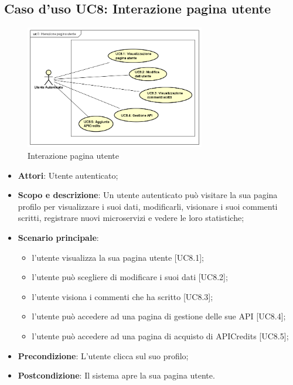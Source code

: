 \documentclass[12pt,a4paper,titlepage]{article}
\begin{document}
	\subsection{Caso d'uso UC8: Interazione pagina utente}
	\label{UC8}
	\begin{figure}[H]
		\centering
		\includegraphics[width=0.7\textwidth]{UseCase/InterazionePaginaUtente}
		\caption{Interazione pagina utente}
	\end{figure}
	\begin{itemize}
		\item \textbf{Attori}: Utente autenticato;
		\item \textbf{Scopo e descrizione}: Un utente autenticato può visitare la sua pagina profilo per visualizzare i suoi dati, modificarli, visionare i suoi commenti scritti, registrare nuovi microservizi e vedere le loro statistiche;
		\item \textbf{Scenario principale}: 
			\begin{itemize}
				\item l'utente visualizza la sua pagina utente [UC8.1];
				\item l'utente può scegliere di modificare i suoi dati [UC8.2];
				\item l'utente visiona i commenti che ha scritto [UC8.3];
				\item l'utente può accedere ad una pagina di gestione delle sue API [UC8.4];
				\item l'utente può accedere ad una pagina di acquisto di APICredits [UC8.5];
			\end{itemize}
		\item \textbf{Precondizione}: L'utente clicca sul suo profilo;
		\item \textbf{Postcondizione}: Il sistema apre la sua pagina utente.
	\end{itemize}
\end{document}
